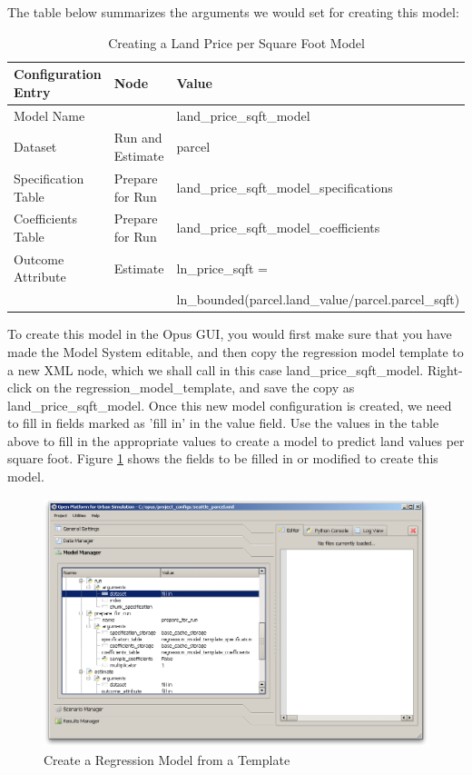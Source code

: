 The table below summarizes the arguments we would set for creating this model:

\begin{table}[htp]
\caption{Creating a Land Price per Square Foot Model}
\label{tab:land-price-sqft-model}
\begin{center}
\begin{tabular}{ p{1.3in}  p{1.3in} p{3.0in}  }
\toprule[1.5pt]
Configuration Entry & Node & Value \\
\midrule
Model Name & & land\_price\_sqft\_model \\
Dataset & Run and Estimate & parcel \\
Specification Table & Prepare for Run & land\_price\_sqft\_model\_specifications \\
Coefficients Table & Prepare for Run & land\_price\_sqft\_model\_coefficients \\
Outcome Attribute & Estimate &ln\_price\_sqft = \\ & & ln\_bounded(parcel.land\_value/parcel.parcel\_sqft)  \\
\bottomrule
\end{tabular}
\end{center}
\end{table}

To create this model in the Opus GUI, you would first make sure that you have made the Model System editable, and then copy the regression model template to a new XML node, which we shall call in this case land\_price\_sqft\_model.  Right-click on the regression\_model\_template, and save the copy as land\_price\_sqft\_model.  Once this new model configuration is created, we need to fill in fields marked as 'fill in' in the value field.  Use the values in the table above to fill in the appropriate values to create a model to predict land values per square foot.  Figure \ref{fig:model-regression-1} shows the fields to be filled in or modified to create this model.

\begin{figure}[htp]
\begin{center}
\includegraphics[scale=0.4]{graphics/create-regression-model.png}
\end{center}
\caption{Create a Regression Model from a Template}
\label{fig:model-regression-1}
\end{figure}

